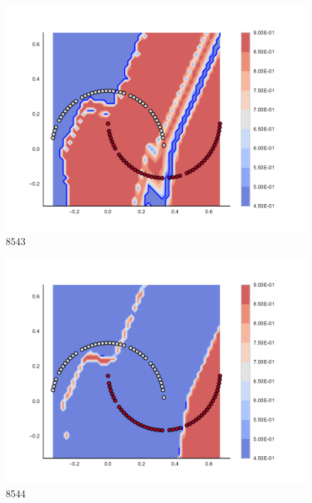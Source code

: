 \begin{subfigure}[b]{0.09\textwidth}
    \includegraphics[clip, trim=2.35cm 1.75cm 4.5cm 0cm,width=\textwidth]{img/convergence/8543.pdf}
    \caption{8543}
    \label{fig:convergence_8543}
\end{subfigure}
%
\begin{subfigure}[b]{0.09\textwidth}
    \includegraphics[clip, trim=2.35cm 1.75cm 4.5cm 0cm,width=\textwidth]{img/convergence/8544.pdf}
    \caption{8544}
    \label{fig:convergence_8544}
\end{subfigure}
%
